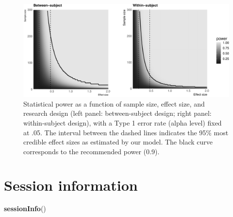 \documentclass[floatsintext,doc]{apa6}
\newenvironment{Shaded}{\begin{snugshade}}{\end{snugshade}}
\newcommand{\KeywordTok}[1]{\textcolor[rgb]{0.13,0.29,0.53}{\textbf{#1}}}
\newcommand{\NormalTok}[1]{#1}
\begin{document}
\begin{figure}
\centering
\includegraphics{supplementary_materials_files/figure-latex/power-1.pdf}
\caption{\label{fig:power}Statistical power as a function of sample size, effect size, and research design (left panel: between-subject design; right panel: within-subject design), with a Type 1 error rate (alpha level) fixed at .05. The interval between the dashed lines indicates the 95\% most credible effect sizes as estimated by our model. The black curve corresponds to the recommended power (0.9).}
\end{figure}

\newpage

\hypertarget{session-information}{%
\section{Session information}\label{session-information}}

\begin{Shaded}
\begin{Highlighting}[]
\KeywordTok{sessionInfo}\NormalTok{()}
\end{Highlighting}
\end{Shaded}
\end{document}
